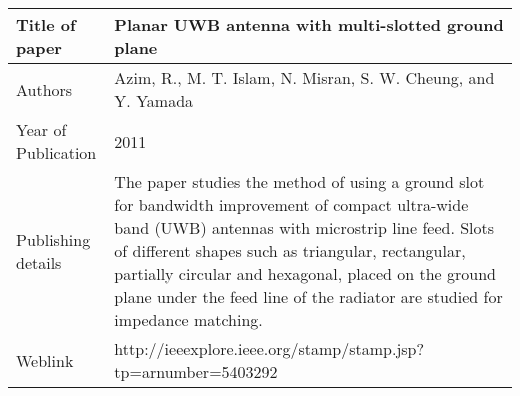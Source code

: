 \documentclass{article}
\begin{document}
\begin{table}
  \centering
	\begin{tabular}{ |l|p{11cm}| }
			\hline
		     Title of paper &  Planar UWB antenna with multi-slotted ground plane \\
		     \hline
			 Authors & Azim, R., M. T. Islam, N. Misran, S. W. Cheung, and Y. Yamada \\
			\hline
			 Year of Publication & 2011 \\
			\hline
			 Publishing details & The paper studies the method of using a ground slot for bandwidth improvement of compact ultra-wide band (UWB) antennas with microstrip line feed. Slots of different shapes such as triangular, rectangular, partially circular and hexagonal, placed on the ground plane under the feed line of the radiator are studied for impedance matching.\\
			\hline
			 Weblink & http://ieeexplore.ieee.org/stamp/stamp.jsp?tp=arnumber=5403292 \\
			 \hline			 
	\end{tabular}		

\end{table}
\end{document}
